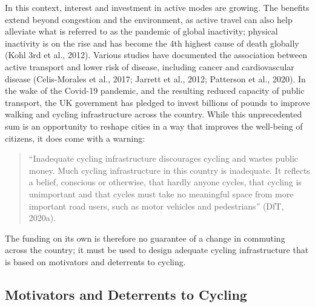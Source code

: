 \documentclass[
]{article}
\begin{document}
In this context, interest and investment in active modes are growing.
The benefits extend beyond congestion and the environment, as active
travel can also help alleviate what is referred to as the pandemic of
global inactivity; physical inactivity is on the rise and has become the
4th highest cause of death globally (Kohl 3rd et al., 2012). Various
studies have documented the association between active transport and
lower risk of disease, including cancer and cardiovascular disease
(Celis-Morales et al., 2017; Jarrett et al., 2012; Patterson et al., 2020). In the wake of the Covid-19 pandemic, and
the resulting reduced capacity of public transport, the UK government
has pledged to invest billions of pounds to improve walking and cycling
infrastructure across the country. While this unprecedented sum is an
opportunity to reshape cities in a way that improves the well-being of
citizens, it does come with a warning:

\begin{quote}
``Inadequate cycling infrastructure discourages cycling and wastes
public money. Much cycling infrastructure in this country is
inadequate. It reflects a belief, conscious or otherwise, that hardly
anyone cycles, that cycling is unimportant and that cycles must take
no meaningful space from more important road users, such as motor
vehicles and pedestrians'' (DfT, 2020a).
\end{quote}

The funding on its own is therefore no guarantee of a change in
commuting across the country; it must be used to design adequate cycling
infrastructure that is based on motivators and deterrents to cycling.

\hypertarget{motivators-and-deterrents-to-cycling}{%
\subsection{Motivators and Deterrents to Cycling}\label{motivators-and-deterrents-to-cycling}}
\end{document}

